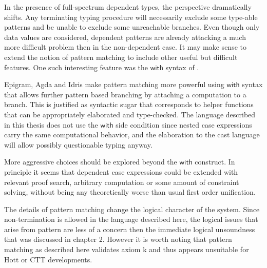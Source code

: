 In the presence of full-spectrum dependent types, the perspective
dramatically shifts. Any terminating typing procedure will necessarily
exclude some type-able patterns and be unable to exclude some unreachable
branches. Even though only data values are considered, dependent patterns
are already attacking a much more difficult problem then in the non-dependent
case. It may make sense to extend the notion of pattern matching to
include other useful but difficult features. One such interesting
feature was the $\mathsf{with}$ syntax of \cite{mcbride_mckinna_2004}.


Epigram, Agda and Idris make pattern matching more powerful using
$\mathsf{with}$ syntax that allows further pattern based branching
by attaching a computation to a branch. This is justified as syntactic
sugar that corresponds to helper functions that can be appropriately
elaborated and type-checked. The language described in this thesis
does not use the $\mathsf{with}$ side condition since nested case
expressions carry the same computational behavior, and the elaboration
to the cast language will allow possibly questionable typing anyway.

More aggressive choices should be explored beyond the $\mathsf{with}$
construct. In principle it seems that dependent case expressions could
be extended with relevant proof search, arbitrary computation or some
amount of constraint solving, without being any theoretically worse
than usual first order unification. 



The details of pattern matching change the logical character of the
system\cite{cockx_devriese_2018}. Since non-termination is allowed
in the language described here, the logical issues that arise from
pattern are less of a concern then the immediate logical unsoundness
that was discussed in chapter 2. However it is worth noting that pattern
matching as described here validates axiom k and thus appears unsuitable
for Hott or CTT developments.

